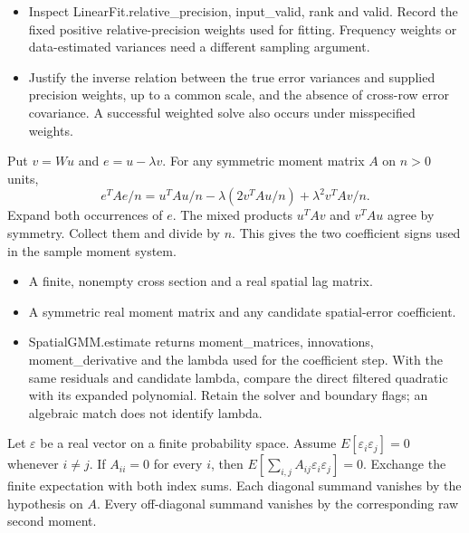 \expandafter\def\csname statadic@diagnostics@STATADIC-LINEAR-011\endcsname{\begin{itemize}
\item Inspect LinearFit.relative\_precision, input\_valid, rank and valid. Record the fixed positive relative-precision weights used for fitting. Frequency weights or data-estimated variances need a different sampling argument.
\item Justify the inverse relation between the true error variances and supplied precision weights, up to a common scale, and the absence of cross-row error covariance. A successful weighted solve also occurs under misspecified weights.
\end{itemize}}
\expandafter\def\csname statadic@statement@STATADIC-GMM-001\endcsname{Put $v=Wu$ and $e=u-\lambda v$. For any symmetric
  moment matrix $A$ on $n>0$ units,
  \[
    e^TAe/n=u^TAu/n-\lambda(2v^TAu/n)+\lambda^2 v^TAv/n .
  \]}
\expandafter\def\csname statadic@proof@STATADIC-GMM-001\endcsname{Expand both occurrences of $e$. The mixed products
  $u^TAv$ and $v^TAu$ agree by symmetry. Collect them and divide by $n$.
  This gives the two coefficient signs used in the sample moment system.}
\expandafter\def\csname statadic@assumptions@STATADIC-GMM-001\endcsname{\begin{itemize}
\item A finite, nonempty cross section and a real spatial lag matrix.
\item A symmetric real moment matrix and any candidate spatial-error coefficient.
\end{itemize}}
\expandafter\def\csname statadic@diagnostics@STATADIC-GMM-001\endcsname{\begin{itemize}
\item SpatialGMM.estimate returns moment\_matrices, innovations, moment\_derivative and the lambda used for the coefficient step. With the same residuals and candidate lambda, compare the direct filtered quadratic with its expanded polynomial. Retain the solver and boundary flags; an algebraic match does not identify lambda.
\end{itemize}}
\expandafter\def\csname statadic@statement@STATADIC-GMM-002\endcsname{Let $\varepsilon$ be a real vector on a finite probability
  space. Assume $E[\varepsilon_i\varepsilon_j]=0$ whenever $i\ne j$.
  If $A_{ii}=0$ for every $i$, then
  $E[\sum_{i,j}A_{ij}\varepsilon_i\varepsilon_j]=0$.}
\expandafter\def\csname statadic@proof@STATADIC-GMM-002\endcsname{Exchange the finite expectation with both index sums.
  Each diagonal summand vanishes by the hypothesis on $A$. Every off-diagonal
  summand vanishes by the corresponding raw second moment.}
